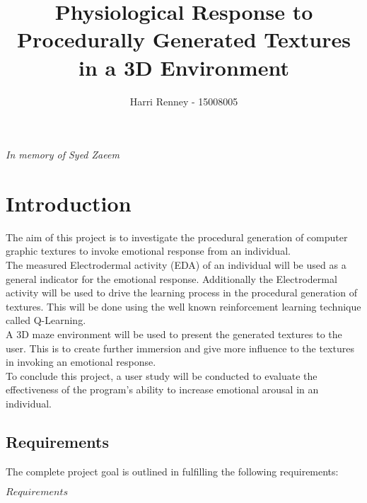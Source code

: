 \documentclass{report}
\title{Physiological Response to Procedurally Generated Textures in a 3D Environment}
\author{Harri Renney - 15008005	}
\begin{document}
\maketitle

\vspace*{\fill}
\begingroup
\centerline{\Large{\textit{In memory of Syed Zaeem}}}
\endgroup
\vspace*{\fill}

\tableofcontents

\listoffigures

\listofalgorithms

\chapter{Introduction}

The aim of this project is to investigate the procedural generation of computer graphic textures to invoke emotional response from an individual.\\
The measured Electrodermal activity (\Gls{EDA}) of an individual will be used as a general indicator for the emotional response.
Additionally the Electrodermal activity will be used to drive the learning process in the procedural generation of textures. This will be done using the well known
reinforcement learning technique called Q-Learning.\\
A 3D maze environment will be used to present the generated textures to the user. This is to create further immersion and give more influence to the textures in invoking an emotional response.\\
To conclude this project, a user study will be conducted to evaluate the effectiveness of the program's ability to increase emotional arousal in an individual.

\section{Requirements}

The complete project goal is outlined in fulfilling the following requirements:

\begin{center}
$Requirements$\\
\end{center}
\end{document}
